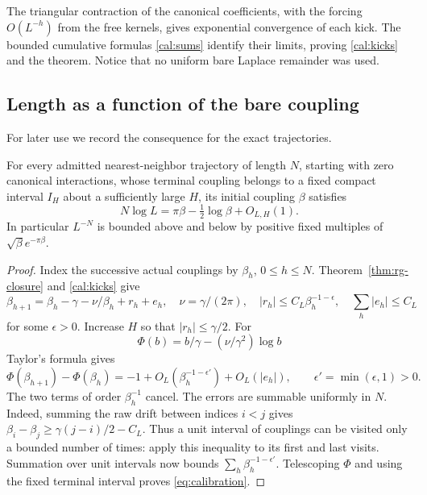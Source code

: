 The triangular contraction of the canonical coefficients, with the
forcing $O(L^{-h})$ from the free kernels, gives exponential convergence
of each kick. The bounded cumulative formulas \eqref{cal:sums}
identify their limits, proving \eqref{cal:kicks} and the theorem.
Notice that no uniform bare Laplace remainder was used.

\subsection{Length as a function of the bare coupling}

For later use we record the consequence for the exact trajectories.

\begin{proposition}
\label{prop:calibration}
For every admitted nearest-neighbor trajectory of length $N$, starting
with zero canonical interactions, whose terminal coupling
belongs to a fixed compact interval $I_H$ about a sufficiently large
$H$, its initial coupling $\beta$ satisfies
\begin{equation}
\label{eq:calibration}
 N\log L=\pi\beta-\tfrac12\log\beta+O_{L,H}(1).
\end{equation}
In particular $L^{-N}$ is bounded above and below by positive fixed
multiples of $\sqrt\beta e^{-\pi\beta}$.
\end{proposition}

\begin{proof}
Index the successive actual couplings by $\beta_h$, $0\le h\le N$.
Theorem~\ref{thm:rg-closure} and \eqref{cal:kicks} give
\[
 \beta_{h+1}=\beta_h-\gamma-\nu/\beta_h+r_h+e_h,
 \quad \nu=\gamma/(2\pi),\quad
 |r_h|\le C_L\beta_h^{-1-\epsilon},\quad
 \sum_h|e_h|\le C_L
\]
for some $\epsilon>0$. Increase $H$ so that $|r_h|\le\gamma/2$.
For
\[
 \Phi(b)=b/\gamma-(\nu/\gamma^2)\log b
\]
Taylor's formula gives
\[
 \Phi(\beta_{h+1})-\Phi(\beta_h)
 =-1+O_L(\beta_h^{-1-\epsilon'})+O_L(|e_h|),
 \qquad \epsilon'=\min(\epsilon,1)>0.
\]
The two terms of order $\beta_h^{-1}$ cancel. The errors are summable
uniformly in $N$. Indeed, summing the raw drift between indices $i<j$
gives $\beta_i-\beta_j\ge\gamma(j-i)/2-C_L$. Thus a unit interval of
couplings can be visited only a bounded number of times: apply this
inequality to its first and last visits. Summation over unit intervals
now bounds $\sum_h\beta_h^{-1-\epsilon'}$.
Telescoping $\Phi$ and using the fixed terminal interval proves
\eqref{eq:calibration}.
\end{proof}


